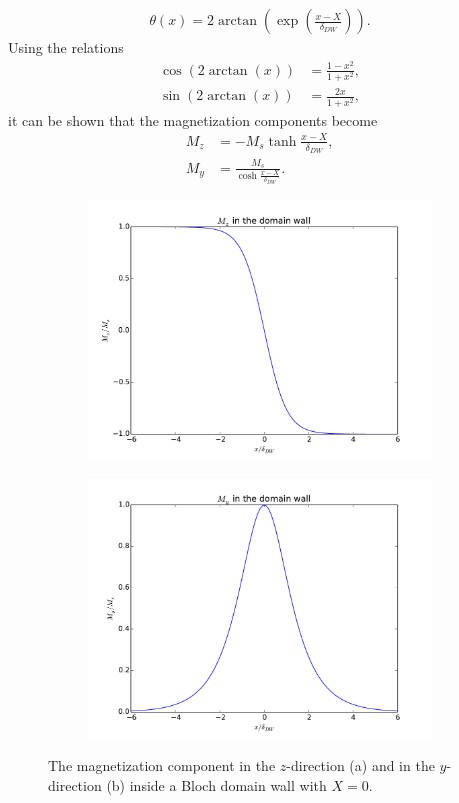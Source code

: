 \documentclass[12pt, a4paper, twoside, openright]{article}		%
\numberwithin{equation}{section}
\begin{document}
\begin{align}
\label{eq:thetaBloch}
\theta(x) = 2\arctan\left(\exp(\frac{x-X}{\delta_{DW}})\right).
\end{align}
Using the relations
\begin{align*}
\cos(2\arctan(x)) &= \frac{1-x^2}{1+x^2}, \\
\sin(2\arctan(x)) &= \frac{2x}{1+x^2},
\end{align*}
it can be shown that the magnetization components become
\begin{align}
M_z &= - M_s\tanh\frac{x-X}{\delta_{DW}}, \label{eq:BlochMagZ} \\
M_y &= \frac{M_s}{\cosh\frac{x-X}{\delta_{DW}}}.
\end{align}
\begin{figure}[h!]
\centering
\begin{subfigure}{.5\textwidth}
  \centering
  \includegraphics[width=1.0\linewidth]{Figures/BlochWallMz}
  \caption{}
\end{subfigure}%
\begin{subfigure}{.5\textwidth}
  \centering
  \includegraphics[width=1.0\linewidth]{Figures/BlochWallMy}
  \caption{}
\end{subfigure}
\caption{The magnetization component in the $z$-direction (a) and in the $y$-direction (b) inside a Bloch domain wall with $X = 0$.}
\label{fig:BlochWall}
\end{figure}
\end{document}
